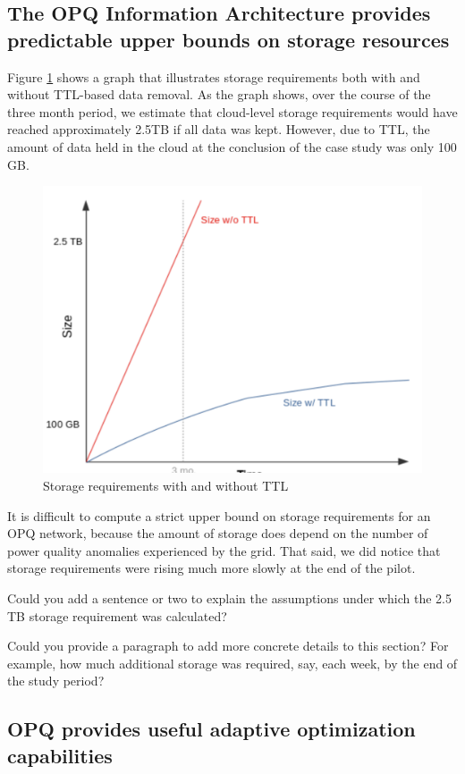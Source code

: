 \subsection{The OPQ Information Architecture provides predictable upper bounds on storage resources}

Figure \ref{fig:data-management-graph} shows a graph that illustrates storage requirements both with and without TTL-based data removal.  As the graph shows, over the course of the three month period, we estimate that cloud-level storage requirements would have reached approximately 2.5TB if all data was kept.  However, due to TTL, the amount of data held in the cloud at the conclusion of the case study was only 100 GB.

\begin{figure}[ht]
  \centering
	\includegraphics[width=0.4\linewidth]{images/pilot/data-management-graph.png}
	\caption{Storage requirements with and without TTL}
	\label{fig:data-management-graph}
\end{figure}

It is difficult to compute a strict upper bound on storage requirements for an OPQ network, because the amount of storage does depend on the number of power quality anomalies experienced by the grid. That said, we did notice that storage requirements were rising much more slowly at the end of the pilot.

\begin{tcolorbox}[colback=red!5!white,colframe=red!75!black,title=ANTHONY]
Could you add a sentence or two to explain the assumptions under which the 2.5 TB storage requirement was calculated?

Could you provide a paragraph to add more concrete details to this section? For example, how much additional storage was required, say, each week, by the end of the study period?

\end{tcolorbox}


\subsection{OPQ provides useful adaptive optimization capabilities}

